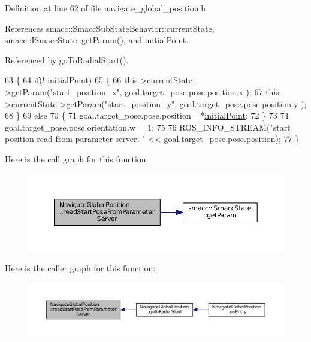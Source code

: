 Definition at line 62 of file navigate\+\_\+global\+\_\+position.\+h.



References smacc\+::\+Smacc\+Sub\+State\+Behavior\+::current\+State, smacc\+::\+I\+Smacc\+State\+::get\+Param(), and initial\+Point.



Referenced by go\+To\+Radial\+Start().


\begin{DoxyCode}
63   \{
64     \textcolor{keywordflow}{if}(! \hyperlink{classNavigateGlobalPosition_a3b8beafc64a18063c86228b6c497102b}{initialPoint})
65     \{
66       this->\hyperlink{classsmacc_1_1SmaccSubStateBehavior_a62e2b9da4a446f09396d0b4c01659b88}{currentState}->\hyperlink{classsmacc_1_1ISmaccState_abbb3a24b912c6e8de28f7b86123b6357}{getParam}(\textcolor{stringliteral}{"start\_position\_x"}, goal.target\_pose.pose.position.x
      );
67       this->\hyperlink{classsmacc_1_1SmaccSubStateBehavior_a62e2b9da4a446f09396d0b4c01659b88}{currentState}->\hyperlink{classsmacc_1_1ISmaccState_abbb3a24b912c6e8de28f7b86123b6357}{getParam}(\textcolor{stringliteral}{"start\_position\_y"}, goal.target\_pose.pose.position.y
      );
68     \}
69     \textcolor{keywordflow}{else}
70     \{
71       goal.target\_pose.pose.position= *\hyperlink{classNavigateGlobalPosition_a3b8beafc64a18063c86228b6c497102b}{initialPoint};
72     \}
73     
74     goal.target\_pose.pose.orientation.w = 1;
75 
76     ROS\_INFO\_STREAM(\textcolor{stringliteral}{"start position read from parameter server: "} << goal.target\_pose.pose.position);
77   \}
\end{DoxyCode}


Here is the call graph for this function\+:
\nopagebreak
\begin{figure}[H]
\begin{center}
\leavevmode
\includegraphics[width=350pt]{classNavigateGlobalPosition_a7f59ee188413d4f4b006549ba6d3d3f8_cgraph}
\end{center}
\end{figure}




Here is the caller graph for this function\+:
\nopagebreak
\begin{figure}[H]
\begin{center}
\leavevmode
\includegraphics[width=350pt]{classNavigateGlobalPosition_a7f59ee188413d4f4b006549ba6d3d3f8_icgraph}
\end{center}
\end{figure}




